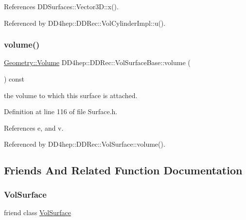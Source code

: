 References D\+D\+Surfaces\+::\+Vector3\+D\+::x().



Referenced by D\+D4hep\+::\+D\+D\+Rec\+::\+Vol\+Cylinder\+Impl\+::u().

\hypertarget{class_d_d4hep_1_1_d_d_rec_1_1_vol_surface_base_a05d942ec9e80220df74b76eb51bc35e9}{}\label{class_d_d4hep_1_1_d_d_rec_1_1_vol_surface_base_a05d942ec9e80220df74b76eb51bc35e9} 
\subsubsection{\texorpdfstring{volume()}{volume()}}
{\footnotesize\ttfamily \hyperlink{class_d_d4hep_1_1_geometry_1_1_volume}{Geometry\+::\+Volume} D\+D4hep\+::\+D\+D\+Rec\+::\+Vol\+Surface\+Base\+::volume (\begin{DoxyParamCaption}{ }\end{DoxyParamCaption}) const\hspace{0.3cm}{\ttfamily [inline]}}



the volume to which this surface is attached. 



Definition at line 116 of file Surface.\+h.



References e, and v.



Referenced by D\+D4hep\+::\+D\+D\+Rec\+::\+Vol\+Surface\+::volume().



\subsection{Friends And Related Function Documentation}
\hypertarget{class_d_d4hep_1_1_d_d_rec_1_1_vol_surface_base_aac662841c478da205fce85f4b5b036f2}{}\label{class_d_d4hep_1_1_d_d_rec_1_1_vol_surface_base_aac662841c478da205fce85f4b5b036f2} 
\subsubsection{\texorpdfstring{Vol\+Surface}{VolSurface}}
{\footnotesize\ttfamily friend class \hyperlink{class_d_d4hep_1_1_d_d_rec_1_1_vol_surface}{Vol\+Surface}\hspace{0.3cm}{\ttfamily [friend]}}



